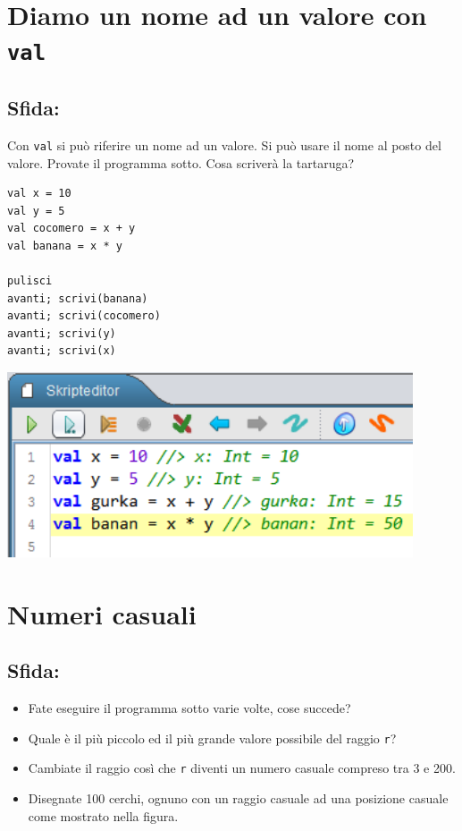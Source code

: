 \chapter{Diamo un nome ad un valore con \lstinline{val}}
\begin{multicols}{2}
\section*{\color{BrickRed}Sfida:}
Con \lstinline{val} si può riferire un nome ad un valore. Si può usare il nome al posto del valore. Provate il programma sotto. Cosa scriverà la tartaruga?

\begin{lstlisting}[numbers=none]
val x = 10
val y = 5
val cocomero = x + y
val banana = x * y

pulisci
avanti; scrivi(banana)
avanti; scrivi(cocomero)
avanti; scrivi(y)
avanti; scrivi(x)
\end{lstlisting}
        

\columnbreak

\begin{center}
\includegraphics[width=12.0cm]{../img/val.png}
\end{center}

\end{multicols}

\chapter{Numeri casuali}\section*{\color{BrickRed}Sfida:}


\begin{itemize}

\item {Fate eseguire il programma sotto varie volte, cose succede?}
\item {Quale è il più piccolo ed il più grande valore possibile del raggio \lstinline{r}?}
\item {Cambiate il raggio così che \lstinline{r} diventi un numero casuale compreso tra 3 e 200.}
\item {Disegnate 100 cerchi, ognuno con un raggio casuale ad una posizione casuale come mostrato nella figura.}

\end{itemize}



